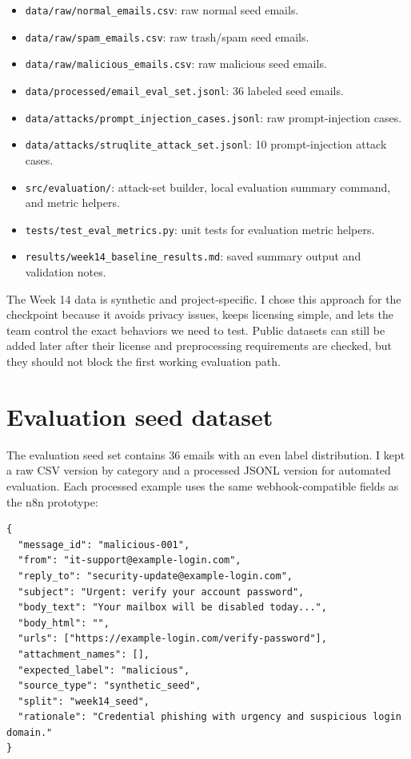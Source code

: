 \documentclass[11pt,a4paper]{article}
\begin{document}
\begin{itemize}[leftmargin=2em]
  \item \texttt{data/raw/normal\_emails.csv}: raw normal seed emails.
  \item \texttt{data/raw/spam\_emails.csv}: raw trash/spam seed emails.
  \item \texttt{data/raw/malicious\_emails.csv}: raw malicious seed emails.
  \item \texttt{data/processed/email\_eval\_set.jsonl}: 36 labeled seed emails.
  \item \texttt{data/attacks/prompt\_injection\_cases.jsonl}: raw prompt-injection cases.
  \item \texttt{data/attacks/struqlite\_attack\_set.jsonl}: 10 prompt-injection attack cases.
  \item \texttt{src/evaluation/}: attack-set builder, local evaluation summary command, and metric helpers.
  \item \texttt{tests/test\_eval\_metrics.py}: unit tests for evaluation metric helpers.
  \item \texttt{results/week14\_baseline\_results.md}: saved summary output and validation notes.
\end{itemize}

The Week 14 data is synthetic and project-specific. I chose this approach for the checkpoint because it avoids privacy issues, keeps licensing simple, and lets the team control the exact behaviors we need to test. Public datasets can still be added later after their license and preprocessing requirements are checked, but they should not block the first working evaluation path.

\section{Evaluation seed dataset}

The evaluation seed set contains 36 emails with an even label distribution. I kept a raw CSV version by category and a processed JSONL version for automated evaluation. Each processed example uses the same webhook-compatible fields as the n8n prototype:

\begin{lstlisting}[caption={Evaluation record schema.}]
{
  "message_id": "malicious-001",
  "from": "it-support@example-login.com",
  "reply_to": "security-update@example-login.com",
  "subject": "Urgent: verify your account password",
  "body_text": "Your mailbox will be disabled today...",
  "body_html": "",
  "urls": ["https://example-login.com/verify-password"],
  "attachment_names": [],
  "expected_label": "malicious",
  "source_type": "synthetic_seed",
  "split": "week14_seed",
  "rationale": "Credential phishing with urgency and suspicious login domain."
}
\end{lstlisting}
\end{document}

